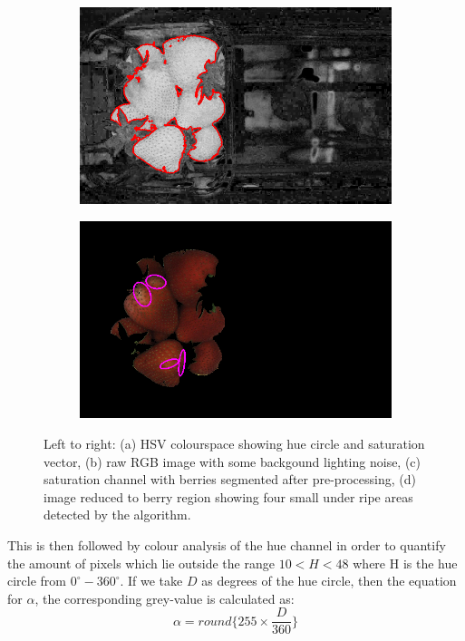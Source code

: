 \documentclass[fleqn,twoside,12pt]{report}
\begin{document}
\begin{figure}[ht]
	\begin{subfigure}{.4\textwidth}
		\centering
		\includegraphics[width=.9\linewidth]{sat_thresh.png}
		\caption{}
		\label{fig:sat_thresh}
	\end{subfigure}%
	\begin{subfigure}{.4\textwidth}
		\centering
		\includegraphics[width=.9\linewidth]{hue_processed.png}
		\caption{}
		\label{fig:hue_processed}
	\end{subfigure}%

	\caption{Left to right: (a) HSV colourspace showing hue circle and saturation vector, (b) raw RGB image with some backgound lighting noise, (c) saturation channel with berries segmented after pre-processing, (d) image reduced to berry region showing four small under ripe areas detected by the algorithm.}
	\label{}
\end{figure}


This is then followed by colour analysis of the hue channel in order to quantify the amount of pixels which lie outside the range $10<H<48$ where H is the hue circle from $0^{\circ}-360^{\circ}$. If we take $D$ as degrees of the hue circle, then the equation for $\alpha$, the corresponding grey-value is calculated as:
\begin{equation}
\alpha = round\Big\{255\times \frac{D}{360}\Big\}
\end{equation}
\end{document}
